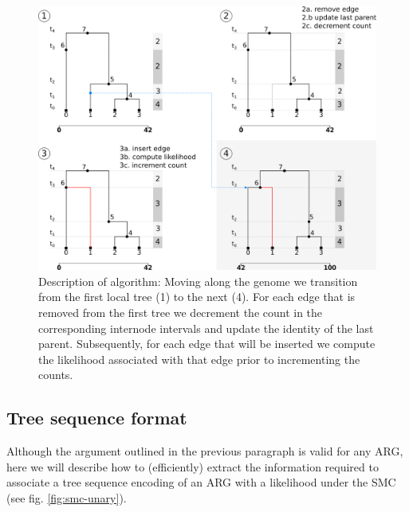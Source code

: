 \documentclass{article}
\begin{document}
\begin{figure}[!ht] \label{fig:algo}
\centering
\includegraphics[width=\textwidth]{figures/ts_algo_2rows.png}
\caption{Description of algorithm: Moving along the genome we transition from the first 
local tree (1) to the next (4). For each edge that is removed from the first tree we 
decrement the count in the corresponding internode intervals and update the identity of 
the last parent. Subsequently, for each edge that will be inserted we compute the likelihood 
associated with that edge prior to incrementing the counts.}
\end{figure}


\subsection{Tree sequence format} \label{par:algo}

Although the argument outlined in the previous paragraph is valid for any ARG, here we 
will describe how to (efficiently) extract the information required to associate a
tree sequence encoding of an ARG with a likelihood under the SMC (see fig. \ref{fig:smc-unary}).\\
\end{document}
